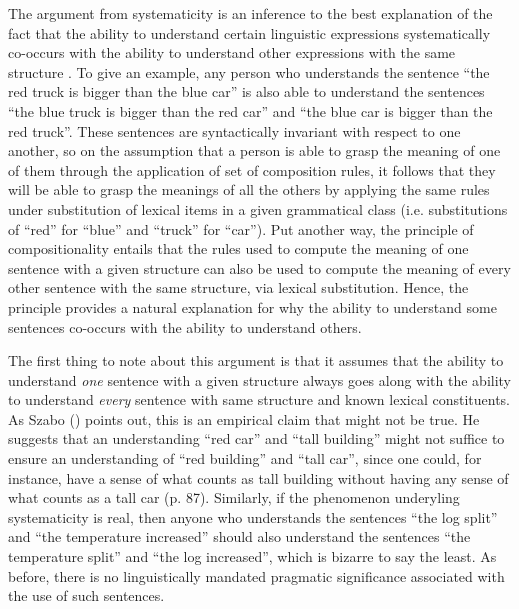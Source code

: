 The argument from systematicity is an inference to the best explanation of the fact that the ability to understand certain linguistic expressions systematically co-occurs with the ability to understand other expressions with the same structure \citep{FodorPylyshyn:1988,Szabo:2012,Szabo:2013,FodorLepore:2002}. To give an example, any person who understands the sentence ``the red truck is bigger than the blue car'' is also able to understand the sentences ``the blue truck is bigger than the red car'' and ``the blue car is bigger than the red truck''. These sentences are syntactically invariant with respect to one another, so on the assumption that a person is able to grasp the meaning of one of them through the application of set of composition rules, it follows that they will be able to grasp the meanings of all the others by applying the same rules under substitution of lexical items in a given grammatical class (i.e. substitutions of ``red'' for ``blue'' and ``truck'' for ``car''). Put another way, the principle of compositionality entails that the rules used to compute the meaning of one sentence with a given structure can also be used to compute the meaning of every other sentence with the same structure, via lexical substitution. Hence, the principle provides a natural explanation for why the ability to understand some sentences co-occurs with the ability to understand others. 

The first thing to note about this argument is that it assumes that the ability to understand \textit{one} sentence with a given structure always goes along with the ability to understand \textit{every} sentence with same structure and known lexical constituents. As Szabo (\citeyear{Szabo:2013,Szabo:2012}) points out, this is an empirical claim that might not be true. He suggests that an understanding ``red car'' and ``tall building'' might not suffice to ensure an understanding of ``red building'' and ``tall car'', since one could, for instance, have a sense of what counts as tall building without having any sense of what counts as a tall car (p. 87). Similarly, if the phenomenon underyling systematicity is real, then anyone who understands the sentences ``the log split'' and ``the temperature increased'' should also understand the sentences ``the temperature split'' and ``the log increased'', which is bizarre to say the least. As before, there is no linguistically mandated pragmatic significance associated with the use of such sentences.

